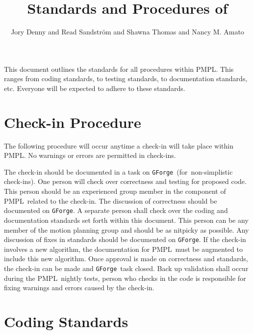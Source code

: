 \documentclass[12pt]{article}
\title{\Large \bf Standards and Procedures of \pmpl}
\author{Jory Denny and Read Sandstr\"{o}m and Shawna Thomas and Nancy M. Amato}
\newcommand{\pmpl}{PMPL}
\newcommand{\gforge}{\texttt{GForge}}
\begin{document}
\lstset{style=C++}

\maketitle
\thispagestyle{empty}
\pagestyle{empty}

This document outlines the standards for all procedures within \pmpl. This
ranges from coding standards, to testing standards, to documentation standards,
etc. Everyone will be expected to adhere to these standards.

\clearpage
\pagestyle{plain}


\section{Check-in Procedure}
The following procedure will occur anytime a check-in will take place within
\pmpl. No warnings or errors are permitted in check-ins.
\begin{algorithmic}[1]
\STATE The check-in should be documented in a task on \gforge\ (for\
non-simplistic check-ins).
\STATE One person will check over correctness and testing for proposed code.
This person should be an experienced group member in the component of \pmpl\
related to the check-in. The discussion of correctness should be documented on
\gforge.
\STATE A separate person shall check over the coding and documentation standards
set forth within this document. This person can be any member of the motion
planning group and should be as nitpicky as possible. Any discussion of fixes in
standards should be documented on \gforge.
\STATE If the check-in involves a new algorithm, the documentation for \pmpl\
must be augmented to include this new algorithm.
\STATE Once approval is made on correctness and standards, the check-in can be
made and \gforge\ task closed.
\STATE Back up validation shall occur during the \pmpl\ nightly tests, person
who checks in the code is responsible for fixing warnings and errors caused by
the check-in.
\end{algorithmic}


\section{Coding Standards}
\end{document}
